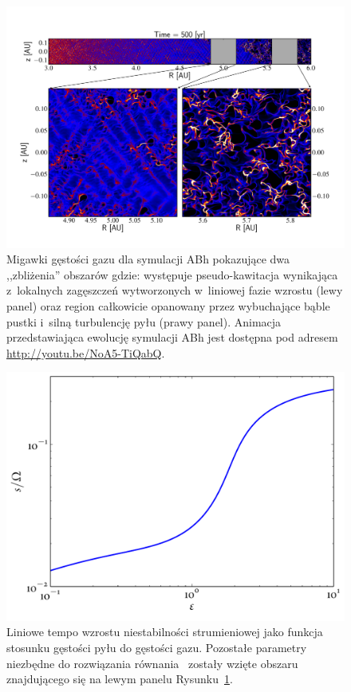 \begin{figure} 
\centering
\includegraphics[width=0.98\linewidth]{figures/fig3}
\caption{Migawki gęstości gazu dla symulacji ABh pokazujące dwa ,,zbliżenia''
   obszarów gdzie: występuje pseudo-kawitacja wynikająca z~lokalnych zagęszczeń
   wytworzonych w~liniowej fazie wzrostu (lewy panel) oraz region całkowicie
   opanowany przez wybuchające bąble pustki i~silną turbulencję pyłu (prawy
   panel). Animacja przedstawiająca ewolucję symulacji ABh jest dostępna pod
   adresem \href{http://youtu.be/NoA5-TiQabQ}{http://youtu.be/NoA5-TiQabQ}.}
\label{fig3}
\end{figure}

\begin{figure}
   \centering
   \includegraphics[width=0.5\linewidth]{figures/growthAB}
   \caption{Liniowe tempo wzrostu niestabilności strumieniowej jako funkcja
      stosunku gęstości pyłu do gęstości gazu. Pozostałe parametry niezbędne do
      rozwiązania równania~ zostały wzięte obszaru znajdującego
   się na lewym panelu Rysunku~\ref{fig3}.}
   \label{fig2b}
\end{figure}


